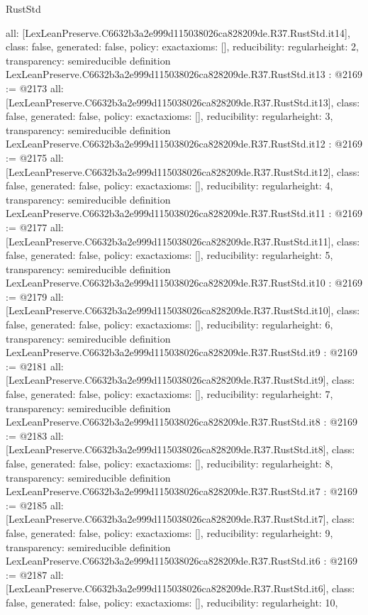 \begin{lexlean}{RustStd}
\begin{coremodule}
{  all: [LexLeanPreserve.C6632b3a2e999d115038026ca828209de.R37.RustStd.it14],
  class: false,
  generated: false,
  policy: exact{axioms: []},
  reducibility: regular{height: 2},
  transparency: semireducible
}
definition LexLeanPreserve.C6632b3a2e999d115038026ca828209de.R37.RustStd.it13 : @2169 := @2173 {
  all: [LexLeanPreserve.C6632b3a2e999d115038026ca828209de.R37.RustStd.it13],
  class: false,
  generated: false,
  policy: exact{axioms: []},
  reducibility: regular{height: 3},
  transparency: semireducible
}
definition LexLeanPreserve.C6632b3a2e999d115038026ca828209de.R37.RustStd.it12 : @2169 := @2175 {
  all: [LexLeanPreserve.C6632b3a2e999d115038026ca828209de.R37.RustStd.it12],
  class: false,
  generated: false,
  policy: exact{axioms: []},
  reducibility: regular{height: 4},
  transparency: semireducible
}
definition LexLeanPreserve.C6632b3a2e999d115038026ca828209de.R37.RustStd.it11 : @2169 := @2177 {
  all: [LexLeanPreserve.C6632b3a2e999d115038026ca828209de.R37.RustStd.it11],
  class: false,
  generated: false,
  policy: exact{axioms: []},
  reducibility: regular{height: 5},
  transparency: semireducible
}
definition LexLeanPreserve.C6632b3a2e999d115038026ca828209de.R37.RustStd.it10 : @2169 := @2179 {
  all: [LexLeanPreserve.C6632b3a2e999d115038026ca828209de.R37.RustStd.it10],
  class: false,
  generated: false,
  policy: exact{axioms: []},
  reducibility: regular{height: 6},
  transparency: semireducible
}
definition LexLeanPreserve.C6632b3a2e999d115038026ca828209de.R37.RustStd.it9 : @2169 := @2181 {
  all: [LexLeanPreserve.C6632b3a2e999d115038026ca828209de.R37.RustStd.it9],
  class: false,
  generated: false,
  policy: exact{axioms: []},
  reducibility: regular{height: 7},
  transparency: semireducible
}
definition LexLeanPreserve.C6632b3a2e999d115038026ca828209de.R37.RustStd.it8 : @2169 := @2183 {
  all: [LexLeanPreserve.C6632b3a2e999d115038026ca828209de.R37.RustStd.it8],
  class: false,
  generated: false,
  policy: exact{axioms: []},
  reducibility: regular{height: 8},
  transparency: semireducible
}
definition LexLeanPreserve.C6632b3a2e999d115038026ca828209de.R37.RustStd.it7 : @2169 := @2185 {
  all: [LexLeanPreserve.C6632b3a2e999d115038026ca828209de.R37.RustStd.it7],
  class: false,
  generated: false,
  policy: exact{axioms: []},
  reducibility: regular{height: 9},
  transparency: semireducible
}
definition LexLeanPreserve.C6632b3a2e999d115038026ca828209de.R37.RustStd.it6 : @2169 := @2187 {
  all: [LexLeanPreserve.C6632b3a2e999d115038026ca828209de.R37.RustStd.it6],
  class: false,
  generated: false,
  policy: exact{axioms: []},
  reducibility: regular{height: 10},
}
\end{coremodule}
\end{lexlean}
